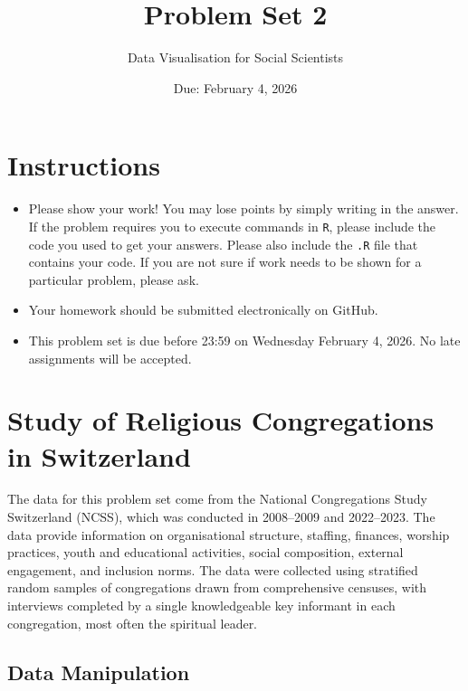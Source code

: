 \documentclass[12pt,letterpaper]{article}
\title{Problem Set 2}
\date{Due: February 4, 2026}
\author{Data Visualisation for Social Scientists}
\begin{document}
	\maketitle
	
	\section*{Instructions}
	\begin{itemize}
	\item Please show your work! You may lose points by simply writing in the answer. If the problem requires you to execute commands in \texttt{R}, please include the code you used to get your answers. Please also include the \texttt{.R} file that contains your code. If you are not sure if work needs to be shown for a particular problem, please ask.
\item Your homework should be submitted electronically on GitHub.
\item This problem set is due before 23:59 on Wednesday February 4, 2026. No late assignments will be accepted.
	\end{itemize}
	
	\vspace{.25cm}
	\section*{Study of Religious Congregations in Switzerland}
	
The data for this problem set come from the	National Congregations Study Switzerland (NCSS), which was conducted in 2008–2009 and 2022–2023. The data provide information on organisational structure, staffing, finances, worship practices, youth and educational activities, social composition, external engagement, and inclusion norms. The data were collected using stratified random samples of congregations drawn from comprehensive censuses, with interviews completed by a single knowledgeable key informant in each congregation, most often the spiritual leader.

\subsection*{Data Manipulation}
\end{document}

